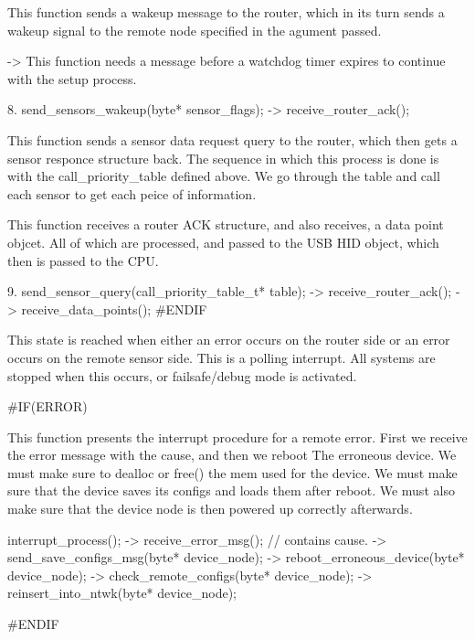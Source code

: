 \begin{DoxyVerb}               This function sends a wakeup message to the router, which
               in its turn sends a wakeup signal to the remote node
               specified in the agument passed.

               -> This function needs a message before a watchdog timer expires
                  to continue with the setup process.

             8. send_sensors_wakeup(byte* sensor_flags);
                -> receive_router_ack();

               This function sends a sensor data request query to the router,
               which then gets a sensor responce structure back. The sequence
               in which this process is done is with the call_priority_table
               defined above. We go through the table and call each sensor
               to get each peice of information.

               This function receives a router ACK structure, and also receives,
               a data point objcet. All of which are processed, and passed to
               the USB HID object, which then is passed to the CPU.

             9. send_sensor_query(call_priority_table_t* table);
                -> receive_router_ack();
                -> receive_data_points();
#ENDIF
\end{DoxyVerb}


This state is reached when either an error occurs on the router side or an error occurs on the remote sensor side. This is a polling interrupt. All systems are stopped when this occurs, or failsafe/debug mode is activated. \begin{DoxyVerb}#IF(ERROR)

       This function presents the interrupt procedure for a remote error.
       First we receive the error message with the cause, and then we reboot
       The erroneous device. We must make sure to dealloc or free() the mem
       used for the device. We must make sure that the device saves its
       configs and loads them after reboot. We must also make sure that the
       device node is then powered up correctly afterwards.

     interrupt_process();
        -> receive_error_msg(); // contains cause.
        -> send_save_configs_msg(byte* device_node);
        -> reboot_erroneous_device(byte* device_node);
        -> check_remote_configs(byte* device_node);
        -> reinsert_into_ntwk(byte* device_node);

#ENDIF  \end{DoxyVerb}
 

